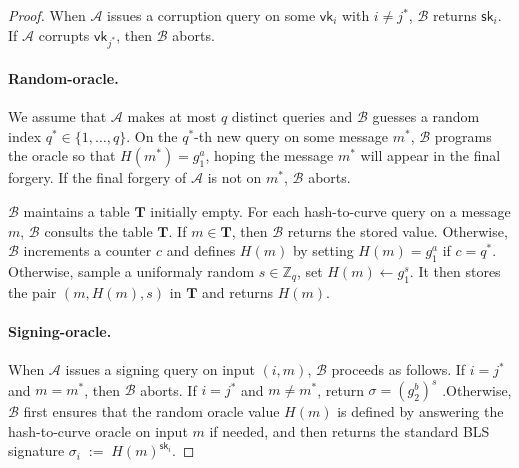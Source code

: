 \documentclass{article}
\begin{document}
\begin{proof}
When $\mathcal{A}$ issues a corruption query on some $\mathsf{vk}_i$ with $i \neq j^\ast$,
$\mathcal{B}$ returns $\mathsf{sk}_i$. If $\mathcal{A}$ corrupts $\mathsf{vk}_{j^\ast}$,
then $\mathcal{B}$ aborts.

\paragraph{Random-oracle.} We assume that $\mathcal{A}$ makes at most $q$ distinct queries and $\mathcal{B}$ guesses a random index $q^\ast \in \{1,\dots,q\}$. On the $q^\ast$-th new query on some message $m^\ast$, $\mathcal{B}$ programs the oracle so that $H(m^\ast) = g_1^a$, hoping the message $m^\ast$ will appear in the final forgery. If the final forgery of $\mathcal{A}$ is not on $m^\ast$, $\mathcal{B}$ aborts. 

$\mathcal{B}$ maintains a table $\mathbf{T}$ initially empty.
For each hash-to-curve query on a message $m$, $\mathcal{B}$ consults the table $\mathbf{T}$. If $m \in \mathbf{T}$, then $\mathcal{B}$ returns the stored value. Otherwise, $\mathcal{B}$ increments a counter $c$ and defines $H(m)$ by setting $H(m)=g_1^a$ if $c=q^\ast$. Otherwise, sample a uniformaly random $s \in \mathbb{Z}_q$, set $H(m) \leftarrow g_1^s$. It then stores the pair $(m,H(m),s)$ in $\mathbf{T}$ and returns $H(m)$.


\paragraph{Signing-oracle.}
When $\mathcal{A}$ issues a signing query on input $(i,m)$, $\mathcal{B}$ proceeds as follows. If $i=j^\ast$ and $m = m^*$, then $\mathcal{B}$ aborts. If $i=j^\ast$ and $m \ne m^*$, return $\sigma = (g_2^b)^s$ .Otherwise, $\mathcal{B}$ first ensures that the random oracle value $H(m)$ is defined by answering the hash-to-curve oracle on input $m$ if needed, and then returns the standard BLS signature $\sigma_i \;:=\; H(m)^{\mathsf{sk}_i}$.






\end{proof}
\end{document}

